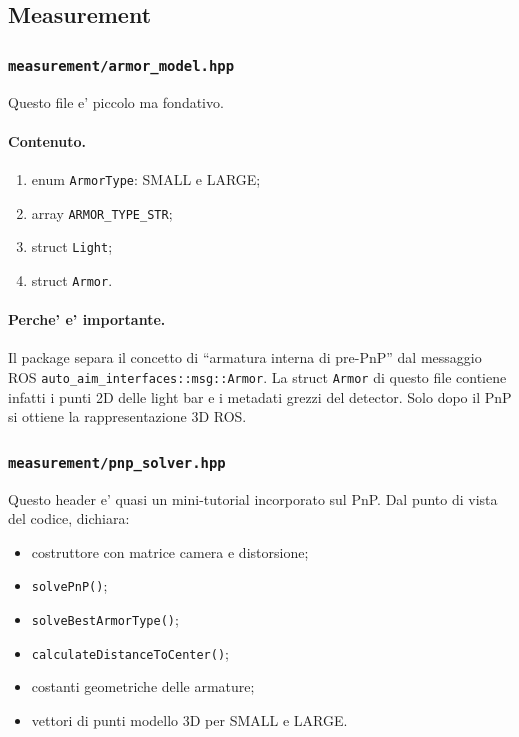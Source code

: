 \documentclass[11pt,a4paper]{article}
\newcommand{\code}[1]{\texttt{#1}}
\begin{document}
\subsection{Measurement}

\subsubsection{\code{measurement/armor\_model.hpp}}

Questo file e' piccolo ma fondativo.

\paragraph{Contenuto.}
\begin{enumerate}[leftmargin=1.4em]
  \item enum \code{ArmorType}: SMALL e LARGE;
  \item array \code{ARMOR\_TYPE\_STR};
  \item struct \code{Light};
  \item struct \code{Armor}.
\end{enumerate}

\paragraph{Perche' e' importante.}
Il package separa il concetto di ``armatura interna di pre-PnP'' dal messaggio ROS \code{auto\_aim\_interfaces::msg::Armor}. La struct \code{Armor} di questo file contiene infatti i punti 2D delle light bar e i metadati grezzi del detector. Solo dopo il PnP si ottiene la rappresentazione 3D ROS.

\subsubsection{\code{measurement/pnp\_solver.hpp}}

Questo header e' quasi un mini-tutorial incorporato sul PnP. Dal punto di vista del codice, dichiara:
\begin{itemize}[leftmargin=1.4em]
  \item costruttore con matrice camera e distorsione;
  \item \code{solvePnP()};
  \item \code{solveBestArmorType()};
  \item \code{calculateDistanceToCenter()};
  \item costanti geometriche delle armature;
  \item vettori di punti modello 3D per SMALL e LARGE.
\end{itemize}
\end{document}
